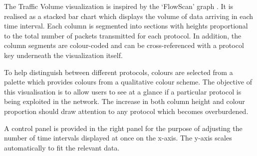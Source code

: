 The Traffic Volume visualization is inspired by the `FlowScan' graph
\cite{plonka2000flowscan}. It is realised as a stacked
bar chart which displays the volume of data arriving in each time interval.
Each column is segmented into sections with heights proportional to the total
number of packets transmitted for each protocol.
In addition, the column segments are colour-coded and can be cross-referenced
with a protocol key underneath the visualization itself.

To help distinguish between different protocols, colours are selected from a
palette which provides colours from a qualitative colour scheme.
The objective of this visualisation is to allow users to see at a glance if a
particular protocol is being exploited in the network. The increase in both
column height and colour proportion should draw attention to any protocol which
becomes overburdened.

A control panel is provided in the right panel for the purpose of adjusting the
number of time intervals displayed at once on the x-axis. The y-axis scales
automatically to fit the relevant data.
